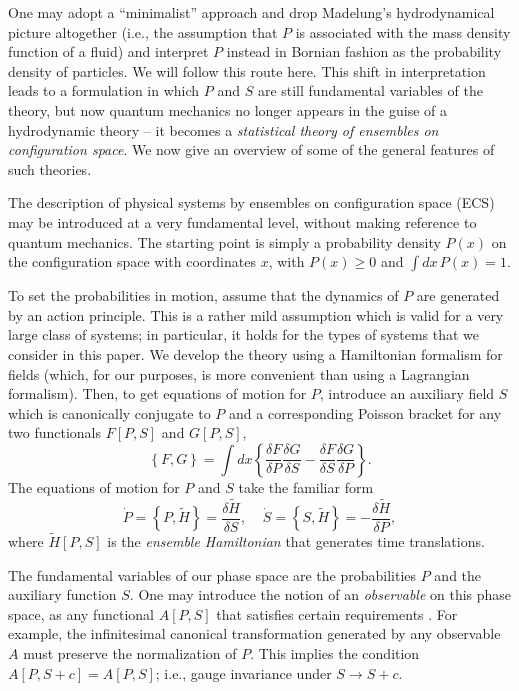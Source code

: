 \documentclass [12pt]{revtex4}
\begin{document}
One may adopt a ``minimalist'' approach and drop Madelung's hydrodynamical picture altogether (i.e., the assumption that $P$ is associated with the mass density function of a fluid) and interpret $P$ instead in Bornian fashion as the probability density of particles. We will follow this route here. This shift in interpretation leads to a formulation in which $P$ and $S$ are still fundamental variables of the theory, but now quantum mechanics no longer appears in the guise of a hydrodynamic theory -- it becomes a {\it statistical theory of ensembles on configuration space}. We now give an overview of some of the general features of such theories.

The description of physical systems by ensembles on configuration space (ECS) may be introduced at a very fundamental level, without making reference to quantum mechanics. The starting point is simply a probability density $P(x)$ on the configuration space with coordinates $x$, with $P(x) \geq 0$ and $\int dx \,P(x) = 1$.

To set the probabilities in motion, assume that the dynamics of $P$ are generated by an action principle. This is a rather mild assumption which is valid for a very large class of systems; in particular, it holds for the types of systems that we consider in this paper. We develop the theory using a Hamiltonian formalism for fields (which, for our purposes, is more convenient than using a Lagrangian formalism). Then, to get equations of motion for $P$, introduce an auxiliary field $S$ which is canonically conjugate to $P$ and a corresponding Poisson bracket for any two functionals $F[P,S]$ and $G[P,S]$,
\begin{equation}\label{PoBr}
\left\{ F,G\right\} =\int dx \left\{
\frac{\delta F}{\delta P} \frac{\delta G}{\delta S}
 - \frac{\delta F}{\delta S}  \frac{\delta G}{\delta P} \right\}.
\end{equation}
The equations of motion for $P$ and $S$ take the familiar form
\begin{equation} \label{EqMoPoBr}
\dot{P} = \left\{ P,\tilde{H}\right\} =\frac{\delta
\tilde{H}}{\delta S},~~~~~
\dot{S} = \left\{ S,\tilde{H}\right\} =-\frac{\delta
\tilde{H}}{\delta P},
\end{equation}
where $\tilde{H}[P,S]$ is the {\it ensemble Hamiltonian} that generates time translations.

The fundamental variables of our phase space are the probabilities $P$ and the auxiliary function $S$. One may introduce the notion of an {\it observable\/} on this phase space, as any functional $A[P,S]$ that satisfies certain requirements \cite{HR2005, H2008}. For example, the infinitesimal canonical transformation generated by any observable $A$ must preserve the normalization of $P$. This implies the condition $A[P,S+c] = A[P,S]$; i.e., gauge invariance under $S\rightarrow S + c$.
\end{document}
